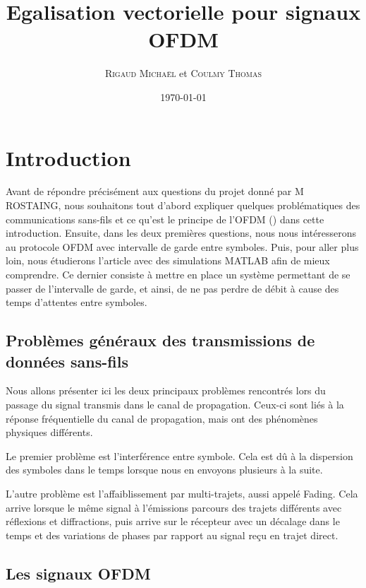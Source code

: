 \documentclass[a4paper, 11pt, oneside, oldfontcommands]{memoir}
\title{Egalisation vectorielle pour signaux OFDM}
\author{\textsc{Rigaud Michaël} et \textsc{Coulmy Thomas}}
\date{\today}
\newcounter{rem}[chapter]
\newcounter{th}[chapter]
\begin{document}
\maketitle
\thispagestyle{empty}
\newpage

\tableofcontents



\chapter*{Introduction}
Avant de répondre précisément aux questions du projet donné par M ROSTAING, nous
souhaitons tout d’abord expliquer quelques problématiques des communications
sans-fils et ce qu’est le principe de l’OFDM () dans cette introduction.
Ensuite, dans les deux premières questions, nous nous intéresserons au protocole
OFDM avec intervalle de garde entre symboles. Puis, pour aller plus loin, nous
étudierons l’article\cite{sujet} avec des simulations MATLAB afin de mieux comprendre.
Ce dernier consiste à mettre en place un système permettant de se passer de
l’intervalle de garde, et ainsi, de ne pas perdre de débit à cause des temps
d’attentes entre symboles.


\section*{Problèmes généraux des transmissions de données sans-fils}
Nous allons présenter ici les deux principaux problèmes rencontrés lors du
passage du signal transmis dans le canal de propagation. Ceux-ci sont liés à la
réponse fréquentielle du canal de propagation, mais ont des phénomènes physiques
différents.

Le premier problème est l’interférence entre symbole. Cela est dû à la
dispersion des symboles dans le temps lorsque nous en envoyons plusieurs à la suite.

L’autre problème est l’affaiblissement par multi-trajets, aussi appelé Fading.
Cela arrive lorsque le même signal à l’émissions parcours des trajets différents
avec réflexions et diffractions, puis arrive sur le récepteur avec un décalage
dans le temps et des variations de phases par rapport au signal reçu en trajet direct.

\section*{Les signaux OFDM}
\end{document}
